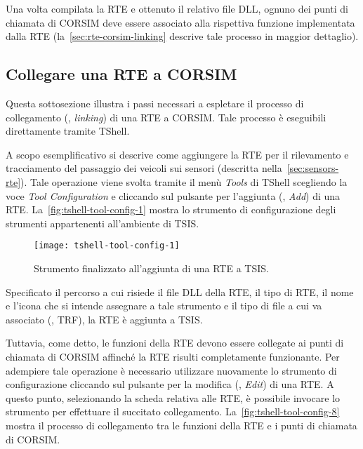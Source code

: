 Una volta compilata la \acs{RTE} e ottenuto il relativo file \acs{DLL}, ognuno dei punti di chiamata di \acs{CORSIM} deve essere associato alla rispettiva funzione implementata dalla \acs{RTE} (la~\vref{sec:rte-corsim-linking} descrive tale processo in maggior dettaglio).

\subsection{Collegare una RTE a CORSIM}\label{sec:rte-corsim-linking}
Questa sottosezione illustra i passi necessari a espletare il processo di collegamento (\ie{}, \emph{linking}) di una \acs{RTE} a \acs{CORSIM}. Tale processo è eseguibili direttamente tramite \acs{TShell}.

A scopo esemplificativo si descrive come aggiungere la \acs{RTE} per il rilevamento e tracciamento del passaggio dei veicoli sui sensori (descritta nella~\vref{sec:sensors-rte}). Tale operazione viene svolta tramite il menù \emph{Tools} di \acs{TShell} scegliendo la voce \emph{Tool Configuration} e cliccando sul pulsante per l'aggiunta (\ie{}, \emph{Add}) di una \acs{RTE}. La~\vref{fig:tshell-tool-config-1} mostra lo strumento di configurazione degli strumenti appartenenti all'ambiente di \acs{TSIS}.

\begin{figure}[ht]
\centering
\texttt{[image: tshell-tool-config-1]}
\caption[Aggiunta di una \acs{RTE} a \acs{TSIS}]{Strumento finalizzato all'aggiunta di una \acs{RTE} a \acs{TSIS}.}
\label{fig:tshell-tool-config-1}
\end{figure}

Specificato il percorso a cui risiede il file \acs{DLL} della \acs{RTE}, il tipo di \acs{RTE}, il nome e l'icona che si intende assegnare a tale strumento e il tipo di file a cui va associato (\eg{}, \acs{TRF}), la \acs{RTE} è aggiunta a \acs{TSIS}.

Tuttavia, come detto, le funzioni della \acs{RTE} devono essere collegate ai punti di chiamata di \acs{CORSIM} affinché la \acs{RTE} risulti completamente funzionante. Per adempiere tale operazione è necessario utilizzare nuovamente lo strumento di configurazione cliccando sul pulsante per la modifica (\ie{}, \emph{Edit}) di una \acs{RTE}. A questo punto, selezionando la scheda relativa alle \acs{RTE}, è possibile invocare lo strumento per effettuare il succitato collegamento. La~\vref{fig:tshell-tool-config-8} mostra il processo di collegamento tra le funzioni della \acs{RTE} e i punti di chiamata di \acs{CORSIM}.

